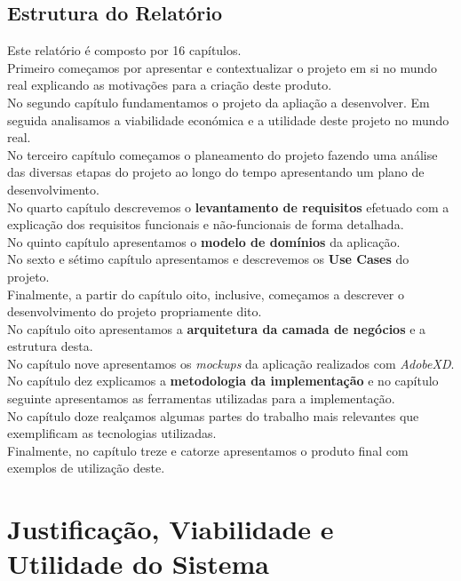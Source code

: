 \documentclass[a4paper]{report}
\begin{document}
    \section{Estrutura do Relatório}
    Este relatório é composto por 16 capítulos.\\
    Primeiro começamos por apresentar e contextualizar o projeto em si no mundo
    real explicando as motivações para a criação deste produto.\\
    No segundo capítulo fundamentamos o projeto da apliação a desenvolver. Em
    seguida analisamos a viabilidade económica e a utilidade deste projeto no
    mundo real.\\
    No terceiro capítulo começamos o planeamento do projeto fazendo uma análise
    das diversas etapas do projeto ao longo do tempo apresentando um plano de
    desenvolvimento.\\
    No quarto capítulo descrevemos o \textbf{levantamento de requisitos}
    efetuado com a explicação dos requisitos funcionais e não-funcionais de
    forma detalhada.\\
    No quinto capítulo apresentamos o \textbf{modelo de domínios} da
    aplicação.\\
    No sexto e sétimo capítulo apresentamos e descrevemos os \textbf{Use Cases}
    do projeto.\\
    Finalmente, a partir do capítulo oito, inclusive, começamos a descrever o
    desenvolvimento do projeto propriamente dito.\\
    No capítulo oito apresentamos a \textbf{arquitetura da camada de negócios}
    e a estrutura desta.\\
    No capítulo nove apresentamos os \textit{mockups} da aplicação realizados
    com \textit{AdobeXD}.\\
    No capítulo dez explicamos a \textbf{metodologia da implementação} e no
    capítulo seguinte apresentamos as ferramentas utilizadas para a
    implementação.\\
    No capítulo doze realçamos algumas partes do trabalho mais relevantes que
    exemplificam as tecnologias utilizadas.\\
    Finalmente, no capítulo treze e catorze apresentamos o produto final com
    exemplos de utilização deste.

\chapter{Justificação, Viabilidade e Utilidade do Sistema}
\end{document}
